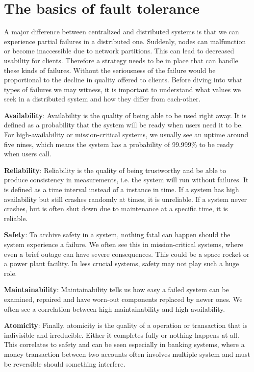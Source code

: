 \section{The basics of fault tolerance}

A major difference between centralized and distributed systems is that we can experience partial failures in a distributed one. Suddenly, nodes can malfunction or become inaccessible due to network partitions. This can lead to decreased usability for clients. Therefore a strategy needs to be in place that can handle these kinds of failures. Without the seriousness of the failure would be proportional to the decline in quality offered to clients. Before diving into what types of failures we may witness, it is important to understand what values we seek in a distributed system and how they differ from each-other.

\noindent \textbf{Availability}: Availability is the quality of being able to be used right away. It is defined as a probability that the system will be ready when users need it to be. For high-availability or mission-critical systems, we usually see an uptime around five nines, which means the system has a probability of 99.999\% to be ready when users call.

\noindent \textbf{Reliability}: Reliability is the quality of being trustworthy and be able to produce consistency in measurements, i.e. the system will run without failures. It is defined as a time interval instead of a instance in time. If a system has high availability but still crashes randomly at times, it is unreliable. If a system never crashes, but is often shut down due to maintenance at a specific time, it is reliable.

\noindent \textbf{Safety}: To archive safety in a system, nothing fatal can happen should the system experience a failure. We often see this in mission-critical systems, where even a brief outage can have severe consequences. This could be a space rocket or a power plant facility. In less crucial systems, safety may not play such a huge role.

\noindent \textbf{Maintainability}: Maintainability tells us how easy a failed system can be examined, repaired and have worn-out components replaced by newer ones. We often see a correlation between high maintainability and high availability. 

\noindent \textbf{Atomicity}: Finally, atomicity is the quality of a operation or transaction that is indivisible and irreducible. Either it completes fully or nothing happens at all. This correlates to safety and can be seen especially in banking systems, where a money transaction between two accounts often involves multiple system and must be reversible should something interfere.

